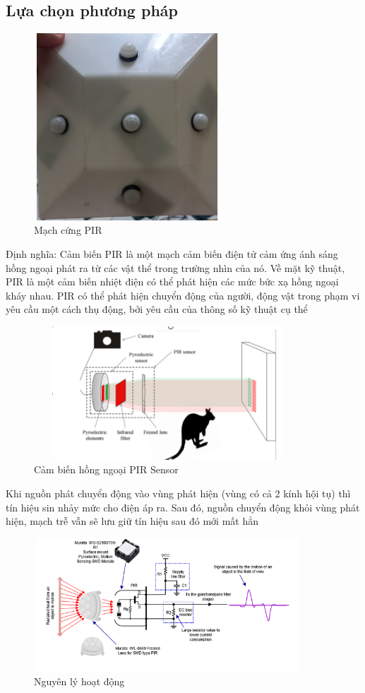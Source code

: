 \documentclass{article}
\begin{document}
\subsection{Lựa chọn phương pháp }
\begin{figure}[H]
    \centering
    \includegraphics[width=7cm,height=7cm]{image/anh_pir.jpg}
    \caption{Mạch cứng PIR} \label{EV}
\end{figure}
Định nghĩa: Cảm biến PIR là một mạch cảm biến điện tử cảm ứng ánh sáng hồng ngoại phát ra từ các vật thể trong trường nhìn của nó. Về mặt kỹ thuật, PIR là một cảm biến nhiệt điện có thể phát hiện các mức bức xạ hồng ngoại kháy nhau. PIR có thể phát hiện chuyển động của người, động vật trong phạm vi yêu cầu một cách thụ động, bởi yêu cầu của thông số kỹ thuật cụ thể  
\begin{figure}[H]
    \centering
    \includegraphics[width=10cm,height=5cm]{image/anh2.png}
    \caption{Cảm biến hồng ngoại PIR Sensor} \label{EV}
\end{figure}
Khi nguồn phát chuyển động vào vùng phát hiện (vùng có cả 2 kính hội tụ) thì tín hiệu sin nhảy mức cho điện áp ra. Sau đó, nguồn chuyển động khỏi vùng phát hiện, mạch trễ vẫn sẽ lưu giữ tín hiệu sau đó mới mất hẳn
\begin{figure}[H]
    \centering
    \includegraphics[width=10cm,height=5cm]{image/anh_3.png}
    \caption{Nguyên lý hoạt động} \label{EV}
\end{figure}
\end{document}
